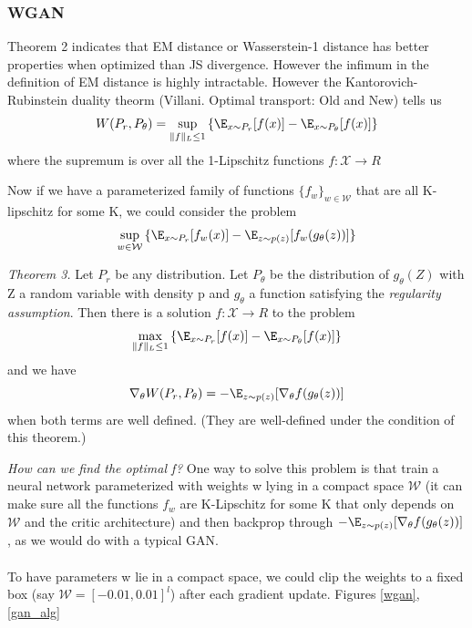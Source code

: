 \documentclass[english]{article}
\begin{document}
\eenum

\subsubsection{WGAN}
\benum



\item 
Theorem 2 indicates that EM distance or Wasserstein-1 distance has better properties when optimized than JS divergence. However the infimum in the definition of EM distance is highly intractable. However the Kantorovich-Rubinstein duality theorm (Villani. Optimal transport: Old and New) tells us 
$$W(P_r,P_\theta)= \sup_{\|f\|_L\le 1} {\{\E_{x\sim P_r}[f(x)]-\E_{x\sim P_\theta}[f(x)]\}}$$
where the supremum is over all the 1-Lipschitz functions $f: \mathcal{X}\rightarrow R$ 


\item 
Now if we have a parameterized family of functions $\{f_w\}_{w\in \mathcal{W}}$ that are all K-lipschitz for some K, we could consider the problem 
$$\sup_{w\in \mathcal{W}} {\{\E_{x\sim P_r}[f_w(x)]-\E_{z\sim p(z)}[f_w(g_\theta(z))]\}}$$






\item {\emph{Theorem 3.}}
Let $P_r$ be any distribution. Let $P_\theta$ be the distribution of $g_\theta(Z)$ with Z a random variable with density p and $g_\theta$ a function satisfying the \emph{regularity assumption}. Then there is a solution $f: \mathcal{X}\rightarrow R$ to the problem 
$$\max_{\|f\|_L \le 1} {\{\E_{x\sim P_r}[f(x)]-\E_{x\sim P_\theta}[f(x)]\}}$$
and we have
$$\nabla_\theta W(P_r,P_\theta)=-\E_{z\sim p(z)}[\nabla_\theta f(g_\theta(z))]$$
when both terms are well defined. (They are well-defined under the condition of this theorem.)




\item {\emph{How can we find the optimal f?}}
One way to solve this problem is that train a neural network parameterized with weights w lying in a compact space $\mathcal{W}$ (it can make sure all the functions $f_w$ are K-Lipschitz for some K that only depends on  $\mathcal{W}$ and the critic architecture) and then backprop through $-\E_{z\sim p(z)}[\nabla_\theta f(g_\theta(z))]$, as we would do with a typical GAN.\\
~\\
To have parameters w lie in a compact space, we could clip the weights to a fixed box (say $\mathcal{W}=[-0.01,0.01]^l$) after each gradient update. Figures \ref{wgan}, \ref{gan_alg}
\end{document}
